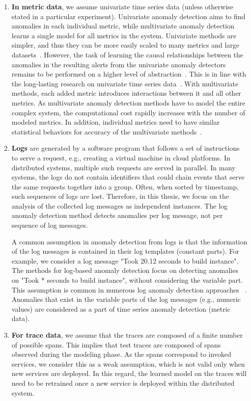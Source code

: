 \begin{enumerate}
    \item \textbf{In metric data}, we assume univariate time series data (unless otherwise stated in a particular experiment). Univariate anomaly detection aims to find anomalies in each individual metric, while multivariate anomaly detection learns a single model for all metrics in the system. Univariate methods are simpler, and thus they can be more easily scaled to many metrics and large datasets~\cite{Sandilands2014}. However, the task of learning the causal relationships between the anomalies in the resulting alerts from the univariate anomaly detectors remains to be performed on a higher level of abstraction~\cite{simhon2016heuristic}. This is in line with the long-lasting research on univariate time series data~\cite{braei2020anomaly}. With multivariate methods, each added metric introduces interactions between it and all other metrics. As multivariate anomaly detection methods have to model the entire complex system, the computational cost rapidly increases with the number of modeled metrics. In addition, individual metrics need to have similar statistical behaviors for accuracy of the multivariate methods~\cite{toledano18a}.
    
    \item \textbf{Logs} are generated by a software program that follows a set of instructions to serve a request, e.g., creating a virtual machine in cloud platforms. In distributed systems, multiple such requests are served in parallel. In many systems, the logs do not contain identifiers that could chain events that serve the same requests together into a group. Often, when sorted by timestamp, such sequences of logs are lost. Therefore, in this thesis, we focus on the analysis of the collected log messages as independent instances. The log anomaly detection method detects anomalies per log message, not per sequence of log messages. 
    
    A common assumption in anomaly detection from logs is that the information of the log messages is contained in their log templates (constant parts). For example, we consider a log message "Took 20.12 seconds to build instance". The methods for log-based anomaly detection focus on detecting anomalies on "Took * seconds to build instance", without considering the variable part. This assumption is common in numerous log anomaly detection approaches ~\cite{du2017deeplog,meng2019loganomaly,zhang2019robust,du2019robust,he2017drain}. Anomalies that exist in the variable parts of the log messages (e.g., numeric values) are considered as a part of time series anomaly detection (metric data). 
    \item \textbf{For trace data}, we assume that the traces are composed of a finite number of possible spans. This implies that test traces are composed of spans observed during the modeling phase. As the spans correspond to invoked services, we consider this as a weak assumption, which is not valid only when new services are deployed. In this regard, the learned model on the traces will need to be retrained once a new service is deployed within the distributed system. 
\end{enumerate}

